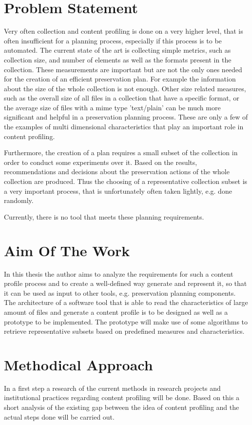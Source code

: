 \section{Problem Statement}
Very often collection and content profiling is done on a very higher level, that
is often insufficient for a planning process, especially if this process is to be automated.
The current state of the art is collecting simple metrics, such as collection size, and number of elements as well as the formats present in the collection. These measurements are important but are not the only ones needed for the creation of an efficient preservation plan.
For example the information about the size of the whole collection is not enough. Other size related measures, such as the overall size of all files in a collection that have a specific format, or the average size of files with a mime type 'text/plain' can be much more significant and helpful in a preservation planning process. These are only a few of the examples of multi dimensional characteristics that play an important role in content profiling.

Furthermore, the creation of a plan requires a small subset of the collection in order to conduct some experiments over it. Based on the results, recommendations and decisions about the preservation actions of the whole collection are produced. Thus the choosing of a representative collection subset is a very important process, that is unfortunately often taken lightly, e.g. done randomly.

Currently, there is no tool that meets these planning requirements.


\section{Aim Of The Work}
In this thesis the author aims to analyze the requirements for such a content profile process and to create a well-defined way generate and represent it, so that it can be used as input to other tools, e.g. preservation planning components.
The architecture of a software tool that is able to read the characteristics of large amount of files and generate a content profile is to be designed as well as a prototype to be implemented. The prototype will make use of some algorithms to retrieve representative subsets based on predefined measures and characteristics.

\section{Methodical Approach}
In a first step a research of the current methods in research projects and institutional practices regarding content profiling will be done. Based on this a short analysis of the existing gap between the idea of content profiling and the actual steps done will be carried out. 

